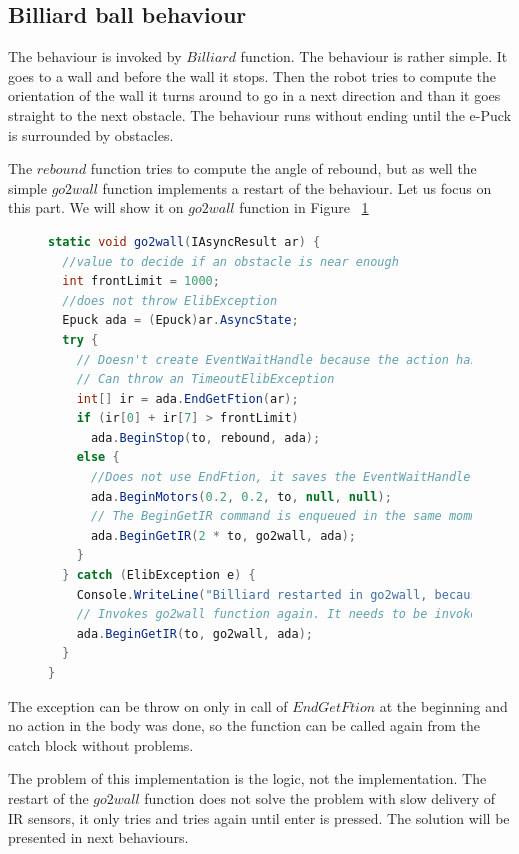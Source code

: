 \subsection{Billiard ball behaviour}\label{ssec:billiard}
  The behaviour is invoked by $Billiard$ function. The behaviour is rather simple.
  It goes to a wall and before the wall it stops. Then the robot tries to compute the
  orientation of the wall it turns around to go in a next direction and than it goes straight
  to the next obstacle.
  The behaviour runs without ending until the e-Puck is surrounded by obstacles.

  The $rebound$ function tries to compute the angle of rebound, but as well the simple $go2wall$ function
  implements a restart of the behaviour.
  Let us focus on this part. We will show it on $go2wall$ function in Figure ~\ref{fig:restart}

\begin{figure}[!hbp]
\begin{lstlisting}[language=cs]
static void go2wall(IAsyncResult ar) {
  //value to decide if an obstacle is near enough
  int frontLimit = 1000;  
  //does not throw ElibException
  Epuck ada = (Epuck)ar.AsyncState;
  try {
    // Doesn't create EventWaitHandle because the action has already completed synchronously.
    // Can throw an TimeoutElibException
    int[] ir = ada.EndGetFtion(ar);    
    if (ir[0] + ir[7] > frontLimit)
      ada.BeginStop(to, rebound, ada);
    else {
      //Does not use EndFtion, it saves the EventWaitHandle. We suppose, that it succeeds now or in next rounds.
      ada.BeginMotors(0.2, 0.2, to, null, null);
      // The BeginGetIR command is enqueued in the same momment as BeginMotors, therefore double timeout is used.
      ada.BeginGetIR(2 * to, go2wall, ada);
    }
  } catch (ElibException e) {
    Console.WriteLine("Billiard restarted in go2wall, because of exception:\n" + e.Message);
    // Invokes go2wall function again. It needs to be invoked by BeginGetIR command, because it expects ar with IR values.
    ada.BeginGetIR(to, go2wall, ada);
  }
}
\end{lstlisting}
\caption{\label{fig:restart} } 
\end{figure}

  The exception can be throw on only in call of $EndGetFtion$ at the beginning and 
  no action in the body was done, so the function can be called again from the catch block without problems.

  The problem of this implementation is the logic, not the implementation. 
  The restart of the $go2wall$ function does not solve the problem with 
  slow delivery of IR sensors, it only tries and tries again until enter is pressed.
  The solution will be presented in next behaviours.


